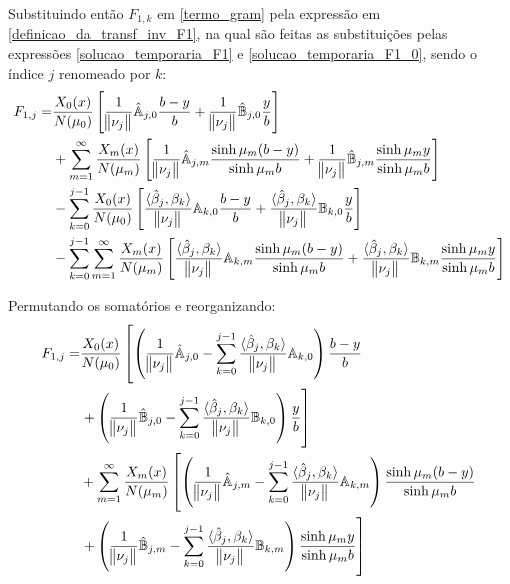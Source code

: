 Substituindo então $F_{1,k}$ em \eqref{termo_gram} pela expressão em \eqref{definicao_da_transf_inv_F1}, na qual são feitas as substituições pelas expressões \eqref{solucao_temporaria_F1} e \eqref{solucao_temporaria_F1_0}, sendo o índice $j$ renomeado por $k$:
\begin{align}
F_{1,j} = & \frac{X_0(x)}{N(\mu_0)}\left[\frac{1}{\norm{\nu_j}} \hat{\mathbb{A}}_{j,0}\frac{b - y}{b} + \frac{1}{\norm{\nu_j}} \hat{\mathbb{B}}_{j,0}\frac{y}{b}\right] \nonumber \\
& + \sum_{m=1}^\infty \frac{X_m(x)}{N(\mu_m)}\left[\frac{1}{\norm{\nu_j}} \hat{\mathbb{A}}_{j,m}\frac{\sinh\mu_m (b - y)}{\sinh\mu_m b} + \frac{1}{\norm{\nu_j}} \hat{\mathbb{B}}_{j,m}\frac{\sinh\mu_m y}{\sinh\mu_m b}\right] \nonumber \\
& - \sum_{k=0}^{j-1} \frac{X_0(x)}{N(\mu_0)}\left[\frac{\langle \hat{\beta}_j, \beta_k \rangle}{\norm{\nu_j}} \mathbb{A}_{k,0}\frac{b - y}{b} + \frac{\langle \hat{\beta}_j, \beta_k \rangle}{\norm{\nu_j}} \mathbb{B}_{k,0}\frac{y}{b}\right] \nonumber \\
		& - \sum_{k=0}^{j-1} \sum_{m=1}^\infty \frac{X_m(x)}{N(\mu_m)}\left[\frac{\langle \hat{\beta}_j, \beta_k \rangle}{\norm{\nu_j}} \mathbb{A}_{k,m}\frac{\sinh\mu_m (b - y)}{\sinh\mu_m b} + \frac{\langle \hat{\beta}_j, \beta_k \rangle}{\norm{\nu_j}} \mathbb{B}_{k,m}\frac{\sinh\mu_m y}{\sinh\mu_m b}\right]
\end{align}

Permutando os somatórios e reorganizando:
\begin{align}
F_{1,j} = & \frac{X_0(x)}{N(\mu_0)}\left[ \left(\frac{1}{\norm{\nu_j}} \hat{\mathbb{A}}_{j,0} - \sum_{k=0}^{j-1} \frac{\langle \hat{\beta}_j, \beta_k \rangle}{\norm{\nu_j}} \mathbb{A}_{k,0}\right)\frac{b - y}{b} \right. \nonumber \\
& \left. + \left(\frac{1}{\norm{\nu_j}} \hat{\mathbb{B}}_{j,0} - \sum_{k=0}^{j-1} \frac{\langle \hat{\beta}_j, \beta_k \rangle}{\norm{\nu_j}} \mathbb{B}_{k,0}\right)\frac{y}{b} \right] \nonumber \\
& + \sum_{m=1}^\infty \frac{X_m(x)}{N(\mu_m)}\left[ \left(\frac{1}{\norm{\nu_j}} \hat{\mathbb{A}}_{j,m} - \sum_{k=0}^{j-1} \frac{\langle \hat{\beta}_j, \beta_k \rangle}{\norm{\nu_j}} \mathbb{A}_{k,m}\right)\frac{\sinh\mu_m (b - y)}{\sinh\mu_m b} \right. \nonumber \\
& \left. + \left(\frac{1}{\norm{\nu_j}} \hat{\mathbb{B}}_{j,m} - \sum_{k=0}^{j-1} \frac{\langle \hat{\beta}_j, \beta_k \rangle}{\norm{\nu_j}} \mathbb{B}_{k,m}\right)\frac{\sinh\mu_m y}{\sinh\mu_m b} \right] \label{equacao_para_comparar_1}
\end{align}


